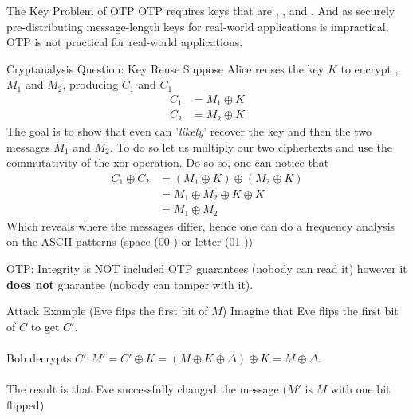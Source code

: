\begin{parag}{The Key Problem of OTP}
    OTP requires keys that are , , and . And as securely pre-distributing message-length keys for real-world applications is impractical, OTP is not practical for real-world applications.
\end{parag}
\begin{parag}{Cryptanalysis Question: Key Reuse}
    Suppose Alice reuses the key $K$ to encrypt , $M_1$ and $M_2$, producing $C_1$ and $C_1$ 
	\begin{align*} 
		C_1 &=  M_1 \oplus K \\
		C_2 &= M_2 \oplus K
	\end{align*}
	The goal is to show that even can '\textit{likely}' recover the key and then the two messages $M_1$ and $M_2$. To do so let us multiply our two ciphertexts and use the commutativity of the xor operation. Do so so, one can notice that 
	\begin{align*} 
		C_1 \oplus C_2 &=  \left(M_1 \oplus K\right) \oplus \left(M_2 \oplus K\right) \\
					   &= M_1 \oplus M_2 \oplus K \oplus K \\
					   &=  M_1 \oplus M_2
	\end{align*}
	Which reveals where the messages differ, hence one can do a frequency analysis on the ASCII patterns (space (00-) or letter (01-))
\end{parag}


\begin{parag}{OTP: Integrity is NOT included}
    OTP guarantees  (nobody can read it) however it \textbf{does not} guarantee  (nobody can tamper with it).
	\begin{subparag}{Attack Example (Eve flips the first bit of $M$)}
	    Imagine that Eve flips the first bit of $C$ to get $C'$.\\
		$ $\\
		Bob decrypts $C' : M' = C' \oplus K = \left(M \oplus K \oplus \Delta\right) \oplus K =  M \oplus \Delta$.\\
		$ $\\
		The result is that Eve successfully changed the message ($M'$ is $M$ with one bit flipped) 
	\end{subparag}

\end{parag}

